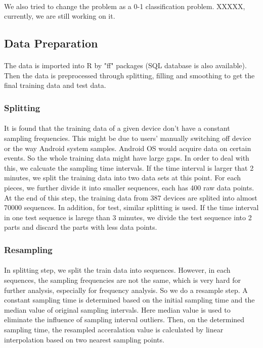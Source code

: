 \documentclass{article}
\begin{document}
	\paragraph{} We also tried to change the problem as a 0-1 classification problem. XXXXX, currently, we are still working on it. 
	
		\subsection{Data Preparation} %
		\label{sub:idea}
		\paragraph{} The data is imported into R by "ff" packages (SQL database is also available). Then the data is preprocessed through splitting, filling and smoothing to get the final training data and test data. 
		 \subsubsection{Splitting}
		\paragraph{}It is found that the training data of a given device don't have a constant sampling frequencies. This might be due to users' manually switching off device or the way Android system samples. Android OS would acquire data on certain events. So the whole training data might have large gaps. In order to deal with this, we calcuate the sampling time intervals. If the time interval is larger that 2 minutes, we split the training data into two data sets at this point. For each pieces, we further divide it into smaller sequences, each has 400 raw data points. At the end of this step, the training data from 387 devices are splited into almost 70000 sequences. 
		In addition, for test, similar splitting is used. If the time interval in one test sequence is larege than 3 minutes, we divide the test sequence into 2 parts and discard the parts with less data points.
		\subsubsection{Resampling}
		\paragraph{} In splitting step, we split the train data into sequences. However, in each sequences, the sampling frequencies are not the same, which is very hard for further analysis, especially for frequency analysis. So we do a resample step. A constant sampling time is determined based on the initial sampling time and the median value of original sampling intervals. Here median value is used to eliminate the influence of sampling interval outliers. Then, on the determined sampling time, the resampled acceralation value is calculated by linear interpolation based on two nearest sampling points. 
\end{document}
